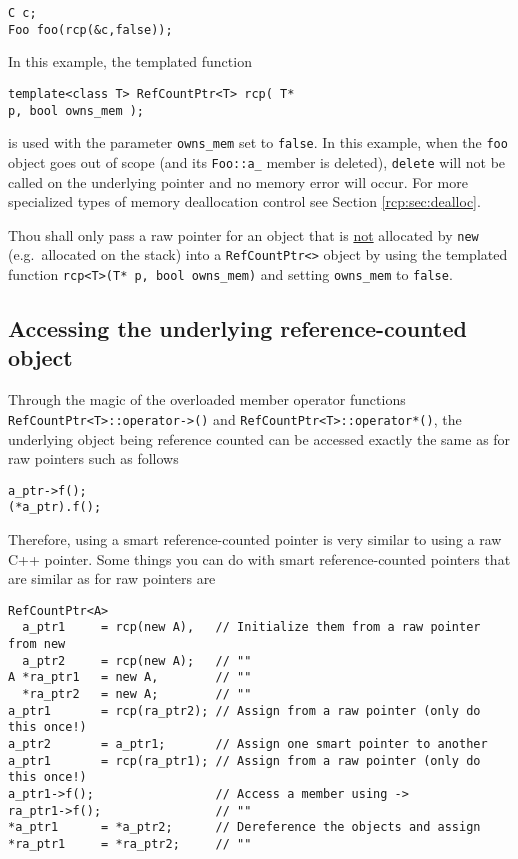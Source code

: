 {\scriptsize\begin{verbatim}
C c;
Foo foo(rcp(&c,false));
\end{verbatim}}

In this example, the templated function

{\scriptsize\begin{verbatim}
template<class T> RefCountPtr<T> rcp( T*
p, bool owns_mem );
\end{verbatim}}

{}\noindent{}is used with the parameter {}\texttt{owns\_mem} set to
{}\texttt{false}.  In this example, when the {}\texttt{foo} object
goes out of scope (and its {}\texttt{Foo::a\_} member is deleted),
{}\texttt{delete} will not be called on the underlying pointer and no
memory error will occur.  For more specialized types of memory
deallocation control see Section {}\ref{rcp:sec:dealloc}.

\begin{commandment}
Thou shall only pass a raw pointer for an object that is
\underline{not} allocated by {}\texttt{new} (e.g.~allocated on the stack) into a
{}\texttt{RefCountPtr<>} object by using the templated function
{}\texttt{rcp<T>(T* p, bool owns\_mem)} and setting {}\texttt{owns\_mem} to
{}\texttt{false}.
\end{commandment}

%
\subsection{Accessing the underlying reference-counted object}
%

Through the magic of the overloaded member operator functions
{}\texttt{RefCountPtr<T>::operator->()} and
{}\texttt{RefCountPtr<T>::operator*()}, the underlying object being reference
counted can be accessed exactly the same as for raw pointers such as
follows

{\scriptsize\begin{verbatim}
a_ptr->f();
(*a_ptr).f();
\end{verbatim}}

Therefore, using a smart reference-counted pointer is very similar to
using a raw C++ pointer.  Some things you can do with smart
reference-counted pointers that are similar as for raw pointers are

{\scriptsize\begin{verbatim}
RefCountPtr<A>
  a_ptr1     = rcp(new A),   // Initialize them from a raw pointer from new
  a_ptr2     = rcp(new A);   // ""
A *ra_ptr1   = new A,        // ""
  *ra_ptr2   = new A;        // ""
a_ptr1       = rcp(ra_ptr2); // Assign from a raw pointer (only do this once!)
a_ptr2       = a_ptr1;       // Assign one smart pointer to another
a_ptr1       = rcp(ra_ptr1); // Assign from a raw pointer (only do this once!)
a_ptr1->f();                 // Access a member using ->
ra_ptr1->f();                // ""
*a_ptr1      = *a_ptr2;      // Dereference the objects and assign
*ra_ptr1     = *ra_ptr2;     // "" 
\end{verbatim}}

